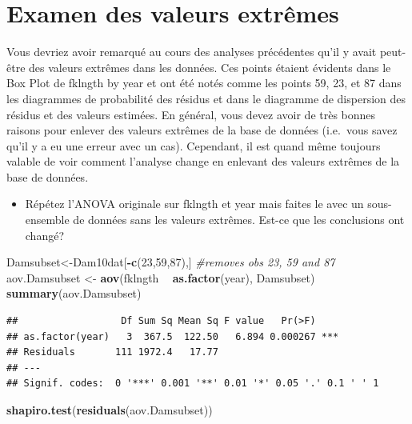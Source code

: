 \documentclass[12pt,]{book}
\newenvironment{Shaded}{\begin{snugshade}}{\end{snugshade}}
\newcommand{\CommentTok}[1]{\textcolor[rgb]{0.37,0.37,0.37}{\textit{#1}}}
\newcommand{\DecValTok}[1]{\textcolor[rgb]{0.06,0.06,0.06}{#1}}
\newcommand{\KeywordTok}[1]{\textcolor[rgb]{0.27,0.27,0.27}{\textbf{#1}}}
\newcommand{\NormalTok}[1]{#1}
\newcommand{\OperatorTok}[1]{\textcolor[rgb]{0.43,0.43,0.43}{\textbf{#1}}}
\newcommand{\StringTok}[1]{\textcolor[rgb]{0.5,0.5,0.5}{#1}}
\providecommand{\tightlist}{%
  \setlength{\itemsep}{0pt}\setlength{\parskip}{0pt}}
\begin{document}
\hypertarget{examen-des-valeurs-extruxeames}{%
\section{Examen des valeurs extrêmes}\label{examen-des-valeurs-extruxeames}}

Vous devriez avoir remarqué au cours des analyses précédentes qu'il y avait peut-être des valeurs extrêmes dans les données. Ces points étaient évidents dans le Box Plot de fklngth by year et ont été notés comme les points 59, 23, et 87 dans les diagrammes de probabilité des résidus et dans le diagramme de dispersion des résidus et des valeurs estimées. En général, vous devez avoir de très bonnes raisons pour enlever des valeurs extrêmes de la base de données (i.e.~vous savez qu'il y a eu une erreur avec un cas). Cependant, il est quand même toujours valable de voir comment l'analyse change en enlevant des valeurs extrêmes de la base de données.

\begin{itemize}
\tightlist
\item
  Répétez l'ANOVA originale sur fklngth et year mais faites le avec un sous-ensemble de données sans les valeurs extrêmes. Est-ce que les conclusions ont changé?
\end{itemize}

\begin{Shaded}
\begin{Highlighting}[]
\NormalTok{Damsubset<-Dam10dat[}\OperatorTok{-}\KeywordTok{c}\NormalTok{(}\DecValTok{23}\NormalTok{,}\DecValTok{59}\NormalTok{,}\DecValTok{87}\NormalTok{),] }\CommentTok{#removes obs 23, 59 and 87}
\NormalTok{aov.Damsubset <-}\StringTok{ }\KeywordTok{aov}\NormalTok{(fklngth }\OperatorTok{~}\StringTok{ }\KeywordTok{as.factor}\NormalTok{(year), Damsubset)}
\KeywordTok{summary}\NormalTok{(aov.Damsubset)}
\end{Highlighting}
\end{Shaded}

\begin{verbatim}
##                  Df Sum Sq Mean Sq F value   Pr(>F)    
## as.factor(year)   3  367.5  122.50   6.894 0.000267 ***
## Residuals       111 1972.4   17.77                     
## ---
## Signif. codes:  0 '***' 0.001 '**' 0.01 '*' 0.05 '.' 0.1 ' ' 1
\end{verbatim}

\begin{Shaded}
\begin{Highlighting}[]
\KeywordTok{shapiro.test}\NormalTok{(}\KeywordTok{residuals}\NormalTok{(aov.Damsubset))}
\end{Highlighting}
\end{Shaded}
\end{document}
